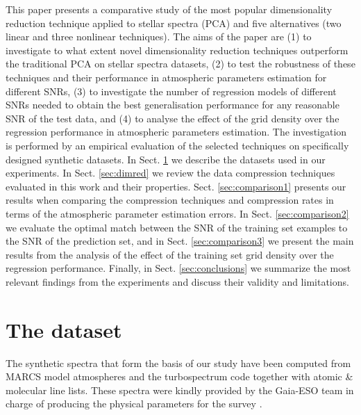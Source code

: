 \documentclass[a4paper,fleqn,usenatbib]{mnras}
\begin{document}
This paper presents a comparative study of the most popular
dimensionality reduction technique applied to stellar spectra (PCA)
and five alternatives (two linear and three nonlinear techniques). The
aims of the paper are (1) to investigate to what extent novel
dimensionality reduction techniques outperform the traditional PCA on
stellar spectra datasets, (2) to test the robustness of these
techniques and their performance in atmospheric parameters estimation
for different SNRs, (3) to investigate the number of regression models
of different SNRs needed to obtain the best generalisation performance
for any reasonable SNR of the test data, and (4) to analyse the effect
of the grid density over the regression performance in atmospheric
parameters estimation.  The investigation is performed by an empirical
evaluation of the selected techniques on specifically designed
synthetic datasets. In Sect. \ref{sec:dataset} we describe the datasets 
used in our experiments. In Sect. \ref{sec:dimred} we review the data compression
techniques evaluated in this work and their properties.  
Sect. \ref{sec:comparison1} presents our results when comparing the 
compression techniques and compression rates in terms of the atmospheric 
parameter estimation errors. In Sect. \ref{sec:comparison2} we evaluate 
the optimal match between the SNR of the training set examples to the SNR 
of the prediction set, and in Sect. \ref{sec:comparison3} we present 
the main results from the analysis of the effect of the training set grid 
density over the regression performance. Finally, in Sect. 
\ref{sec:conclusions} we summarize the most relevant findings from 
the experiments and discuss their validity and limitations.

\section{The dataset}
\label{sec:dataset}

The synthetic spectra that form the basis of our study have been
computed from MARCS model atmospheres \citep{gustafsson:08} and the
turbospectrum code \citep{alvarez:98, plez:12} together with atomic \&
molecular line lists. These spectra were kindly provided by the
Gaia-ESO team in charge of producing the physical parameters for the
survey \citep[see][for further details]{2012A&A...544A.126D}.
\end{document}
